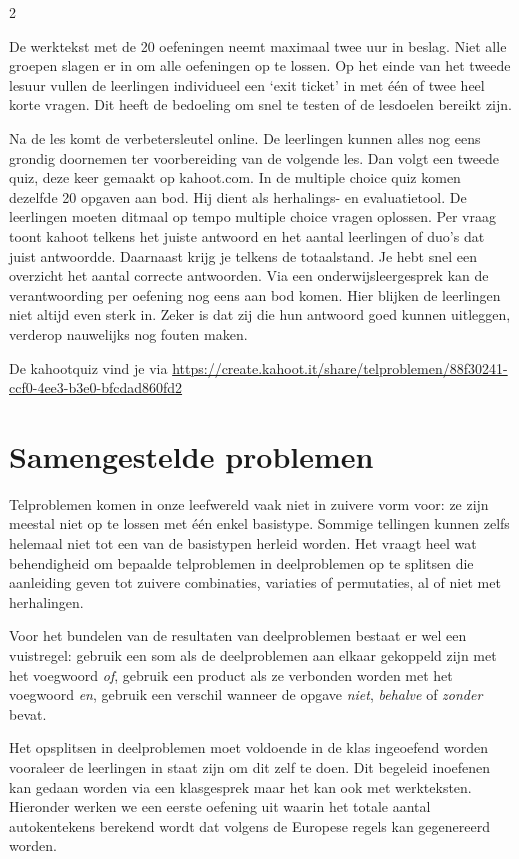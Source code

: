 \begin{multicols}{2}


De werktekst met de 20 oefeningen neemt maximaal twee uur in beslag. Niet alle groepen slagen er in om alle oefeningen op te lossen. Op het einde van het tweede lesuur vullen de leerlingen individueel een `exit ticket' in met één of twee heel korte vragen. Dit heeft de bedoeling om snel te testen of de lesdoelen bereikt zijn. 

Na de les komt de verbetersleutel online. De leerlingen kunnen alles nog eens grondig doornemen ter voorbereiding van de volgende les. Dan volgt een tweede quiz, deze keer gemaakt op kahoot.com. In de multiple choice quiz komen dezelfde 20 opgaven aan bod. Hij dient als herhalings- en evaluatietool. De leerlingen moeten ditmaal op tempo multiple choice vragen oplossen.
Per vraag toont kahoot telkens het juiste antwoord en het aantal leerlingen of duo's dat juist antwoordde. Daarnaast krijg je telkens de totaalstand. Je hebt snel een overzicht het aantal correcte antwoorden. Via een onderwijsleergesprek kan de verantwoording per oefening nog eens aan bod komen. Hier blijken de leerlingen niet altijd even sterk in. Zeker is dat zij die hun antwoord goed kunnen uitleggen, verderop nauwelijks nog fouten maken. 

De kahootquiz vind je via 
\url{https://create.kahoot.it/share/telproblemen/88f30241-ccf0-4ee3-b3e0-bfcdad860fd2}

\section {Samengestelde problemen}

Telproblemen komen in onze leefwereld vaak niet in zuivere vorm voor: ze zijn meestal niet op te lossen met één enkel basistype. Sommige tellingen kunnen zelfs helemaal niet tot een van de basistypen herleid worden. Het vraagt heel wat behendigheid om bepaalde telproblemen in deelproblemen op te splitsen die aanleiding geven tot zuivere combinaties, variaties of permutaties, al of niet met herhalingen.

Voor het bundelen van de resultaten van deelproblemen bestaat er wel een vuistregel: gebruik een som als de deelproblemen aan elkaar gekoppeld zijn met het voegwoord \emph{of}, gebruik een product als ze verbonden worden met het voegwoord \emph{en}, gebruik een verschil wanneer de opgave \emph{niet}, \emph{behalve} of \emph{zonder} bevat.


Het opsplitsen in deelproblemen moet voldoende in de klas ingeoefend worden vooraleer de leerlingen in staat zijn om dit zelf te doen. Dit begeleid inoefenen kan gedaan worden via een klasgesprek maar het kan ook met werkteksten. Hieronder werken we een eerste oefening uit waarin het totale aantal autokentekens berekend wordt dat volgens de Europese regels kan gegenereerd worden.

\end{multicols}


